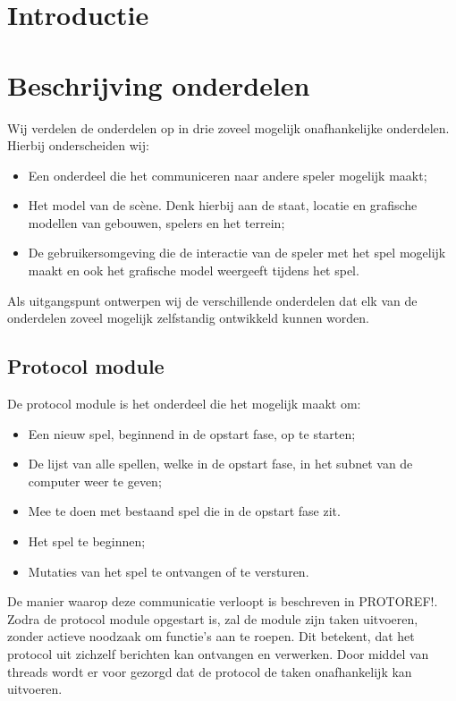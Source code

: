 \documentclass[a4paper,11pt]{article}
\newcommand{\protoref}{PROTOREF!}
\begin{document}
	
	
	\tableofcontents
	\newpage

	\section{Introductie}
	
	\newpage
    
    
    \section{Beschrijving onderdelen}
    Wij verdelen de onderdelen op in drie zoveel mogelijk onafhankelijke onderdelen. Hierbij onderscheiden wij:
    \begin{itemize}
    	\item Een onderdeel die het communiceren naar andere speler mogelijk maakt;
	\item Het model van de sc\`ene. Denk hierbij aan de staat, locatie en grafische modellen van gebouwen, spelers en het terrein;
	\item De gebruikersomgeving die de interactie van de speler met het spel mogelijk maakt en ook het grafische model weergeeft tijdens het spel.
    \end{itemize}
    
    Als uitgangspunt ontwerpen wij de verschillende onderdelen dat elk van de onderdelen zoveel mogelijk zelfstandig ontwikkeld kunnen worden.
    	
    \subsection{Protocol module}
    	De protocol module is het onderdeel die het mogelijk maakt om:
	\begin{itemize}
		\item Een nieuw spel, beginnend in de opstart fase, op te starten;
		\item De lijst van alle spellen, welke in de opstart fase, in het subnet van de computer weer te geven;
		\item Mee te doen met bestaand spel die in de opstart fase zit.
		\item Het spel te beginnen;
		\item Mutaties van het spel te ontvangen of te versturen.
	\end{itemize}
	De manier waarop deze communicatie verloopt is beschreven in \protoref. Zodra de protocol module opgestart is, zal de module zijn taken uitvoeren, zonder actieve noodzaak om functie's aan te roepen. Dit betekent, dat het protocol uit zichzelf berichten kan ontvangen en verwerken. Door middel van threads wordt er voor gezorgd dat de protocol de taken onafhankelijk kan uitvoeren.
	
\end{document}

